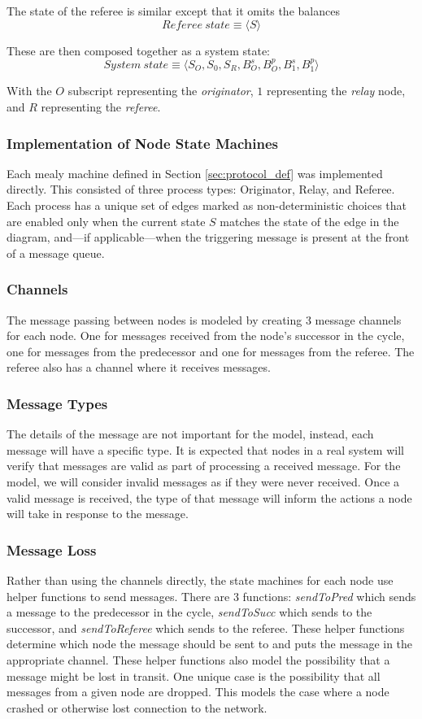 \documentclass[runningheads]{llncs}
\begin{document}
The state of the referee is similar except that it omits the balances
$$Referee~state \equiv \langle S \rangle$$

These are then composed together as a system state:
$$System~state \equiv \langle S_O, S_0, S_R, B^s_O, B^p_O, B^s_1, B^p_1 \rangle$$

With the $O$ subscript representing the \emph{originator}, $1$ representing the \emph{relay} node, and $R$ representing the \emph{referee}.

\subsubsection{Implementation of Node State Machines} 
Each mealy machine defined in Section \ref{sec:protocol_def} was implemented directly. This consisted of three process types: Originator, Relay, and Referee. Each process has a unique set of edges marked as non-deterministic choices that are enabled only when the current state $S$ matches the state of the edge in the diagram, and---if applicable---when the triggering message is present at the front of a message queue.


\subsubsection{Channels}
The message passing between nodes is modeled by creating 3 message channels for each node. One for messages received from the node's successor in the cycle, one for messages from the predecessor and one for messages from the referee. The referee also has a channel where it receives messages.

\subsubsection{Message Types}
The details of the message are not important for the model, instead, each message will have a specific type. It is expected that nodes in a real system will verify that messages are valid as part of processing a received message. For the model, we will consider invalid messages as if they were never received. Once a valid message is received, the type of that message will inform the actions a node will take in response to the message.

\subsubsection{Message Loss}
Rather than using the channels directly, the state machines for each node use helper functions to send messages. There are 3 functions: \emph{sendToPred} which sends a message to the predecessor in the cycle, \emph{sendToSucc} which sends to the successor, and \emph{sendToReferee} which sends to the referee. These helper functions determine which node the message should be sent to and puts the message in the appropriate channel. These helper functions also model the possibility that a message might be lost in transit.  One unique case is the possibility that all messages from a given node are dropped. This models the case where a node crashed or otherwise lost connection to the network. 
\end{document}
